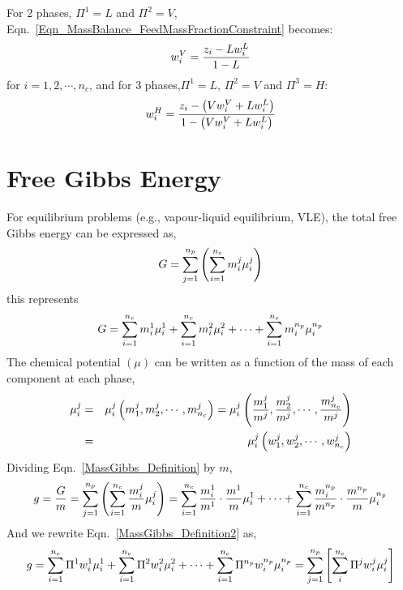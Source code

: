 \begin{shaded}
   For 2 phases, $\Pi^{1}=L$ and $\Pi^{2}=V$, Eqn.~\ref{Eqn_MassBalance_FeedMassFractionConstraint} becomes:
     \begin{displaymath}
      w_{i}^{V} = \displaystyle\frac{z_{i}-Lw_{i}^{L}}{1-L}
     \end{displaymath}
     for $i=1,2,\cdots,n_{c}$, and for 3 phases,$\Pi^{1}=L$, $\Pi^{2}=V$ and $\Pi^{3}=H$:
        \begin{displaymath}
           w_{i}^{H} = \displaystyle\frac{z_{i}-\left(V w_{i}^{V} + L w_{i}^{L}\right)}{1 - \left(V w_{i}^{V} + L w_{i}^{L}\right)}
        \end{displaymath}
\end{shaded}

\section{Free Gibbs Energy}
For equilibrium problems (e.g., vapour-liquid equilibrium, VLE), the total free Gibbs energy can be expressed as,
\begin{equation}
G = \sum\limits_{j=1}^{n_{p}}\left(\sum\limits_{i=1}^{n_{c}} m_{i}^{j}\mu_{i}^{j}\right)
\label{MassGibbs_Definition}
\end{equation} 
this represents
\begin{displaymath}
G = \sum\limits_{i=1}^{n_{c}} m_{i}^{1}\mu_{i}^{1} + \sum\limits_{i=1}^{n_{c}} m_{i}^{2}\mu_{i}^{2} + \cdots + \sum\limits_{i=1}^{n_{c}} m_{i}^{n_{p}}\mu_{i}^{n_{p}}
\end{displaymath}
The chemical potential $\left(\mu\right)$ can be written as a function of the mass of each component at each phase,
\begin{eqnarray}
\mu_{i}^{j} &=& \mu_{i}^{j}\left(m_{1}^{j}, m_{2}^{j}, \cdots, m_{n_{c}}^{j}\right) = \mu_{i}^{j}\left(\displaystyle\frac{m_{1}^{j}}{m^{j}}, \displaystyle\frac{m_{2}^{j}}{m^{j}}, \cdots, \displaystyle\frac{m_{n_{c}}^{j}}{m^{j}}\right)\nonumber \\
 &=& \mu_{i}^{j}\left(w_{1}^{j}, w_{2}^{j}, \cdots, w_{n_{c}}^{j}\right)\label{chempotential_functional}
\end{eqnarray}
Dividing Eqn.~\ref{MassGibbs_Definition} by $m$,
\begin{equation}
g = \displaystyle\frac{G}{m} = \sum\limits_{j=1}^{n_{p}}\left(\sum\limits_{i=1}^{n_{c}}\displaystyle\frac{m_{i}^{j}}{m}\mu_{i}^{j}\right) = \sum\limits_{i=1}^{n_{c}}\displaystyle\frac{m_{i}^{1}}{m^{1}} \cdot \displaystyle\frac{m^{1}}{m} \mu_{i}^{1} + \cdots + \sum\limits_{i=1}^{n_{c}}\displaystyle\frac{m_{i}^{n_{p}}}{m^{n_{p}}} \cdot \displaystyle\frac{m^{n_{p}}}{m} \mu_{i}^{n_{p}}
\label{MassGibbs_Definition2}
\end{equation}
And we rewrite Eqn.~\ref{MassGibbs_Definition2} as,
\begin{equation}
g = \sum\limits_{i=1}^{n_{c}}\Pi^{1}w_{i}^{1}\mu_{i}^{1} + \sum\limits_{i=1}^{n_{c}}\Pi^{2}w_{i}^{2}\mu_{i}^{2} + \cdots + \sum\limits_{i=1}^{n_{c}}\Pi^{n_{p}}w_{i}^{n_{p}}\mu_{i}^{n_{p}} = \sum\limits_{j=1}^{n_{p}}\left[\sum\limits_{i}^{n_{c}}\Pi^{j}w_{i}^{j}\mu_{i}^{j}\right] \label{MassGibbs_Definition3}
\end{equation}


